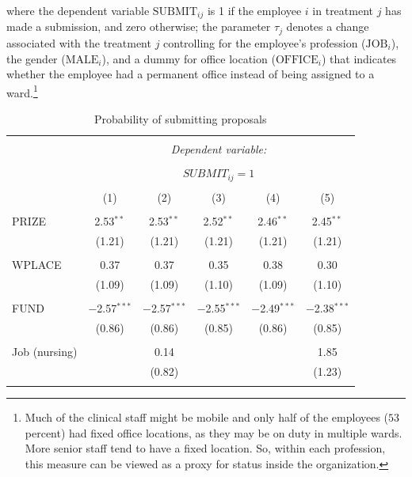 \documentclass[12pt, titlepage]{article}
\begin{document}
where the dependent variable \(\text{SUBMIT}_{ij}\) is 1 if the employee
\(i\) in treatment \(j\) has made a submission, and zero otherwise; the
parameter \(\tau_{j}\) denotes a change associated with the treatment
\(j\) controlling for the employee's profession (\(\text{JOB}_i\)), the
gender (\(\text{MALE}_i\)), and a dummy for office location
(\(\text{OFFICE}_i\)) that indicates whether the employee had a
permanent office instead of being assigned to a ward.\footnote{Much of
  the clinical staff might be mobile and only half of the employees
  (\(53\) percent) had fixed office locations, as they may be on duty in
  multiple wards. More senior staff tend to have a fixed location. So,
  within each profession, this measure can be viewed as a proxy for
  status inside the organization.}

\begin{table}
\centering
\caption{Probability of submitting proposals}\label{tab: probability submitting}
\begin{tabular}{@{\extracolsep{5pt}}lccccc} 
\\[-1.8ex]\hline 
\hline \\[-1.8ex] 
 & \multicolumn{5}{c}{\textit{Dependent variable:}} \\ 
\cline{2-6} 
\\[-1.8ex] & \multicolumn{5}{c}{ $SUBMIT_{ij}=1$ } \\ 
\\[-1.8ex] & (1) & (2) & (3) & (4) & (5)\\ 
\hline \\[-1.8ex] 
 PRIZE & 2.53$^{**}$ & 2.53$^{**}$ & 2.52$^{**}$ & 2.46$^{**}$ & 2.45$^{**}$ \\ 
  & (1.21) & (1.21) & (1.21) & (1.21) & (1.21) \\ 
  & & & & & \\ 
 WPLACE & 0.37 & 0.37 & 0.35 & 0.38 & 0.30 \\ 
  & (1.09) & (1.09) & (1.10) & (1.09) & (1.10) \\ 
  & & & & & \\ 
 FUND & $-$2.57$^{***}$ & $-$2.57$^{***}$ & $-$2.55$^{***}$ & $-$2.49$^{***}$ & $-$2.38$^{***}$ \\ 
  & (0.86) & (0.86) & (0.85) & (0.86) & (0.85) \\ 
  & & & & & \\ 
 Job (nursing) &  & 0.14 &  &  & 1.85 \\ 
  &  & (0.82) &  &  & (1.23) \\ 
  & & & & & \\ 

\end{tabular}
\end{table}
\end{document}
